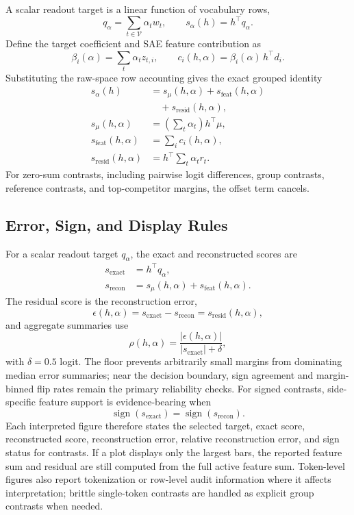 A scalar readout target is a linear function of vocabulary rows,
\[
    q_\alpha = \sum_{t\in\mathcal{V}} \alpha_t w_t,
    \qquad
    s_\alpha(h)=h^\top q_\alpha .
\]
Define the target coefficient and SAE feature contribution as
\[
    \beta_i(\alpha)=\sum_t \alpha_t z_{t,i},
    \qquad
    c_i(h,\alpha)=\beta_i(\alpha)\,h^\top d_i .
\]
Substituting the raw-space row accounting gives the exact grouped identity
\[
\begin{aligned}
    s_\alpha(h)
    &=
    s_{\mu}(h,\alpha)
    +s_{\mathrm{feat}}(h,\alpha)\\
    &\quad
    +s_{\mathrm{resid}}(h,\alpha),\\
    s_{\mu}(h,\alpha)
    &=
    \left(\sum_t \alpha_t\right)h^\top\mu,\\
    s_{\mathrm{feat}}(h,\alpha)
    &=
    \sum_i c_i(h,\alpha),\\
    s_{\mathrm{resid}}(h,\alpha)
    &=
    h^\top\sum_t \alpha_t r_t .
\end{aligned}
\]
For zero-sum contrasts, including pairwise logit differences, group contrasts,
reference contrasts, and top-competitor margins, the offset term
cancels.

\subsection{Error, Sign, and Display Rules}
\label{app:score-accounting-fidelity}
\label{app:display-taxonomy}
\label{app:display-residual-accounting}

For a scalar readout target \(q_\alpha\), the exact and reconstructed scores are
\[
\begin{aligned}
    s_{\mathrm{exact}}
    &=
    h^\top q_\alpha,\\
    s_{\mathrm{recon}}
    &=
    s_{\mu}(h,\alpha)
    +
    s_{\mathrm{feat}}(h,\alpha).
\end{aligned}
\]
The residual score is the reconstruction error,
\[
    \epsilon(h,\alpha)
    =
    s_{\mathrm{exact}}-s_{\mathrm{recon}}
    =
    s_{\mathrm{resid}}(h,\alpha),
\]
and aggregate summaries use
\[
    \rho(h,\alpha)
    =
    \frac{|\epsilon(h,\alpha)|}{|s_{\mathrm{exact}}|+\delta},
\]
with \(\delta=0.5\) logit. The floor prevents arbitrarily small margins from
dominating median error summaries; near the decision boundary, sign agreement and
margin-binned flip rates remain the primary reliability checks. For signed
contrasts, side-specific feature support is evidence-bearing when
\[
    \operatorname{sign}(s_{\mathrm{exact}})
    =
    \operatorname{sign}(s_{\mathrm{recon}}).
\]
Each interpreted figure therefore states the selected target, exact score,
reconstructed score, reconstruction error, relative reconstruction error, and
sign status for contrasts. If a plot displays only the largest bars, the
reported feature sum and residual are still computed from the full active
feature sum. Token-level figures also report tokenization or row-level audit
information where it affects interpretation; brittle single-token contrasts are
handled as explicit group contrasts when needed.
